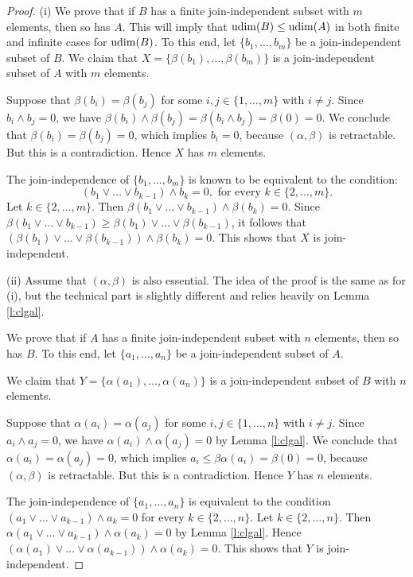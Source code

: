 \documentclass[11pt,a4paper]{amsart}
\begin{document}
\begin{proof} (i) We prove that if $B$ has a finite join-independent subset with $m$ elements, then so has $A$.
This will imply that ${\rm udim}(B)\leq {\rm udim}(A)$ in both finite and infinite cases for ${\rm udim}(B)$. To this
end, let $\{b_1,\dots,b_m\}$ be a join-independent subset of $B$. We claim that $X=\{\beta(b_1),\dots,\beta(b_m)\}$ is
a join-independent subset of $A$ with $m$ elements. 

Suppose that $\beta(b_i)=\beta(b_j)$ for some $i,j\in \{1,\dots,m\}$ with $i\neq j$. Since $b_i\wedge b_j=0$,
we have $\beta(b_i)\wedge \beta(b_j)=\beta(b_i\wedge b_j)=\beta(0)=0$. We conclude that $\beta(b_i)=\beta(b_j)=0$,
which implies $b_i=0$, because $(\alpha,\beta)$ is retractable. But this is a contradiction. Hence $X$ has $m$
elements.

The join-independence of $\{b_1,\dots,b_m\}$ is known to be equivalent to the condition: $$(b_1\vee \ldots
\vee b_{k-1})\wedge b_k=0, \textrm{ for every } k\in \{2,\dots,m\}.$$ Let $k\in \{2,\dots,m\}$. Then
$\beta(b_1\vee \ldots \vee b_{k-1})\wedge \beta(b_k)=0$. Since $\beta(b_1\vee \ldots \vee b_{k-1})\geq \beta(b_1)\vee
\ldots \vee \beta(b_{k-1})$, it follows that $(\beta(b_1)\vee \ldots \vee \beta(b_{k-1}))\wedge \beta(b_k)=0$. This
shows that $X$ is join-independent.

(ii) Assume that $(\alpha,\beta)$ is also essential. The idea of the proof is the same as for (i), but the technical
part is slightly different and relies heavily on Lemma \ref{l:clgal}. 

We prove that if $A$ has a finite join-independent subset with $n$ elements, then so has $B$.
To this end, let $\{a_1,\dots,a_n\}$ be a join-independent subset of $A$. 

We claim that $Y=\{\alpha(a_1),\dots,\alpha(a_n)\}$ is a join-independent subset of $B$ with $n$ elements. 

Suppose that $\alpha(a_i)=\alpha(a_j)$ for some $i,j\in \{1,\dots,n\}$ with $i\neq j$. Since $a_i\wedge a_j=0$, we have
$\alpha(a_i)\wedge \alpha(a_j)=0$ by Lemma \ref{l:clgal}. We conclude that $\alpha(a_i)=\alpha(a_j)=0$,
which implies $a_i\leq \beta\alpha(a_i)=\beta(0)=0$, because $(\alpha,\beta)$ is retractable. But this is a
contradiction. Hence $Y$ has $n$ elements.

The join-independence of $\{a_1,\dots,a_n\}$ is equivalent to the condition $(a_1\vee \ldots
\vee a_{k-1})\wedge a_k=0$ for every $k\in \{2,\dots,n\}$. Let $k\in \{2,\dots,n\}$. Then $\alpha(a_1\vee \ldots
\vee a_{k-1})\wedge \alpha(a_k)=0$ by Lemma \ref{l:clgal}. Hence $(\alpha(a_1)\vee \ldots \vee
\alpha(a_{k-1}))\wedge \alpha(a_k)=0$. This shows that $Y$ is join-independent.


\end{proof}
\end{document}
